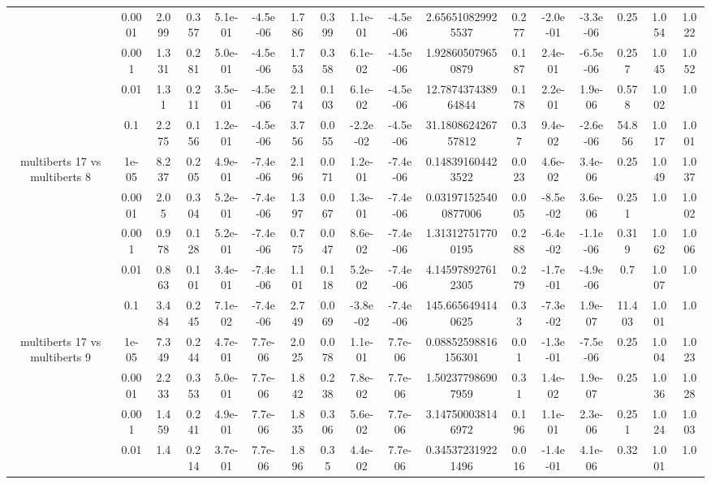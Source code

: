 \begin{tabular}{|c|c|c|c|c|c|c|c|c|c|c|c|c|c|c|c|c|}
 & 0.0001 & 2.099 & 0.357 & 5.1e-01 & -4.5e-06 & 1.786 & 0.399 & 1.1e-01 & -4.5e-06 & 2.656510829925537 & 0.277 & -2.0e-01 & -3.3e-06 & 0.25 & 1.054 & 1.022 \\
 & 0.001 & 1.331 & 0.281 & 5.0e-01 & -4.5e-06 & 1.753 & 0.358 & 6.1e-02 & -4.5e-06 & 1.928605079650879 & 0.187 & 2.4e-01 & -6.5e-06 & 0.257 & 1.045 & 1.052 \\
 & 0.01 & 1.31 & 0.211 & 3.5e-01 & -4.5e-06 & 2.174 & 0.103 & 6.1e-02 & -4.5e-06 & 12.787437438964844 & 0.178 & 2.2e-01 & 1.9e-06 & 0.578 & 1.002 & 1.0 \\
 & 0.1 & 2.275 & 0.156 & 1.2e-01 & -4.5e-06 & 3.756 & 0.055 & -2.2e-02 & -4.5e-06 & 31.180862426757812 & 0.37 & 9.4e-02 & -2.6e-06 & 54.856 & 1.017 & 1.001 \\
\hline
\multirow{5}{*}{multiberts 17 vs multiberts 8} & 1e-05 & 8.237 & 0.205 & 4.9e-01 & -7.4e-06 & 2.196 & 0.071 & 1.2e-01 & -7.4e-06 & 0.148391604423522 & 0.023 & 4.6e-02 & 3.4e-06 & 0.25 & 1.049 & 1.037 \\
 & 0.0001 & 2.05 & 0.304 & 5.2e-01 & -7.4e-06 & 1.397 & 0.067 & 1.3e-01 & -7.4e-06 & 0.031971525400877006 & 0.005 & -8.5e-02 & 3.6e-06 & 0.251 & 1.0 & 1.002 \\
 & 0.001 & 0.978 & 0.128 & 5.2e-01 & -7.4e-06 & 0.775 & 0.047 & 8.6e-02 & -7.4e-06 & 1.313127517700195 & 0.288 & -6.4e-02 & -1.1e-06 & 0.319 & 1.062 & 1.006 \\
 & 0.01 & 0.863 & 0.101 & 3.4e-01 & -7.4e-06 & 1.101 & 0.118 & 5.2e-02 & -7.4e-06 & 4.145978927612305 & 0.279 & -1.7e-01 & -4.9e-06 & 0.7 & 1.007 & 1.0 \\
 & 0.1 & 3.484 & 0.245 & 7.1e-02 & -7.4e-06 & 2.749 & 0.069 & -3.8e-02 & -7.4e-06 & 145.6656494140625 & 0.33 & -7.3e-02 & 1.9e-07 & 11.403 & 1.001 & 1.0 \\
\hline
\multirow{5}{*}{multiberts 17 vs multiberts 9} & 1e-05 & 7.349 & 0.244 & 4.7e-01 & 7.7e-06 & 2.025 & 0.078 & 1.1e-01 & 7.7e-06 & 0.08852598816156301 & 0.01 & -1.3e-01 & -7.5e-06 & 0.25 & 1.004 & 1.023 \\
 & 0.0001 & 2.233 & 0.353 & 5.0e-01 & 7.7e-06 & 1.842 & 0.238 & 7.8e-02 & 7.7e-06 & 1.502377986907959 & 0.31 & 1.4e-02 & 1.9e-07 & 0.25 & 1.036 & 1.028 \\
 & 0.001 & 1.459 & 0.241 & 4.9e-01 & 7.7e-06 & 1.835 & 0.306 & 5.6e-02 & 7.7e-06 & 3.147500038146972 & 0.196 & 1.1e-01 & 2.3e-06 & 0.251 & 1.024 & 1.003 \\
 & 0.01 & 1.4 & 0.214 & 3.7e-01 & 7.7e-06 & 1.896 & 0.35 & 4.4e-02 & 7.7e-06 & 0.345372319221496 & 0.016 & -1.4e-01 & 4.1e-06 & 0.32 & 1.001 & 1.0 \\

\end{tabular}
